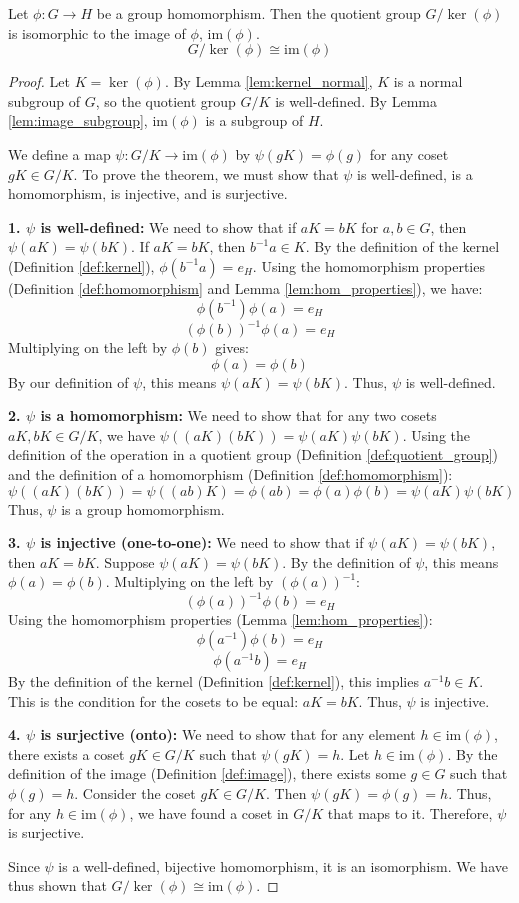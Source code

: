 \begin{theorem}
\label{thm:first_isomorphism}
Let $\phi: G \to H$ be a group homomorphism. Then the quotient group $G/\ker(\phi)$ is isomorphic to the image of $\phi$, $\text{im}(\phi)$.
$$ G/\ker(\phi) \cong \text{im}(\phi) $$
\end{theorem}
\begin{proof}
Let $K = \ker(\phi)$. By Lemma \ref{lem:kernel_normal}, $K$ is a normal subgroup of $G$, so the quotient group $G/K$ is well-defined. By Lemma \ref{lem:image_subgroup}, $\text{im}(\phi)$ is a subgroup of $H$.

We define a map $\psi: G/K \to \text{im}(\phi)$ by $\psi(gK) = \phi(g)$ for any coset $gK \in G/K$. To prove the theorem, we must show that $\psi$ is well-defined, is a homomorphism, is injective, and is surjective.

\textbf{1. $\psi$ is well-defined:}
We need to show that if $aK = bK$ for $a, b \in G$, then $\psi(aK) = \psi(bK)$.
If $aK = bK$, then $b^{-1}a \in K$.
By the definition of the kernel (Definition \ref{def:kernel}), $\phi(b^{-1}a) = e_H$.
Using the homomorphism properties (Definition \ref{def:homomorphism} and Lemma \ref{lem:hom_properties}), we have:
$$ \phi(b^{-1})\phi(a) = e_H $$
$$ (\phi(b))^{-1}\phi(a) = e_H $$
Multiplying on the left by $\phi(b)$ gives:
$$ \phi(a) = \phi(b) $$
By our definition of $\psi$, this means $\psi(aK) = \psi(bK)$. Thus, $\psi$ is well-defined.

\textbf{2. $\psi$ is a homomorphism:}
We need to show that for any two cosets $aK, bK \in G/K$, we have $\psi((aK)(bK)) = \psi(aK)\psi(bK)$.
Using the definition of the operation in a quotient group (Definition \ref{def:quotient_group}) and the definition of a homomorphism (Definition \ref{def:homomorphism}):
$$ \psi((aK)(bK)) = \psi((ab)K) = \phi(ab) = \phi(a)\phi(b) = \psi(aK)\psi(bK) $$
Thus, $\psi$ is a group homomorphism.

\textbf{3. $\psi$ is injective (one-to-one):}
We need to show that if $\psi(aK) = \psi(bK)$, then $aK = bK$.
Suppose $\psi(aK) = \psi(bK)$. By the definition of $\psi$, this means $\phi(a) = \phi(b)$.
Multiplying on the left by $(\phi(a))^{-1}$:
$$ (\phi(a))^{-1}\phi(b) = e_H $$
Using the homomorphism properties (Lemma \ref{lem:hom_properties}):
$$ \phi(a^{-1})\phi(b) = e_H $$
$$ \phi(a^{-1}b) = e_H $$
By the definition of the kernel (Definition \ref{def:kernel}), this implies $a^{-1}b \in K$.
This is the condition for the cosets to be equal: $aK = bK$.
Thus, $\psi$ is injective.

\textbf{4. $\psi$ is surjective (onto):}
We need to show that for any element $h \in \text{im}(\phi)$, there exists a coset $gK \in G/K$ such that $\psi(gK) = h$.
Let $h \in \text{im}(\phi)$. By the definition of the image (Definition \ref{def:image}), there exists some $g \in G$ such that $\phi(g) = h$.
Consider the coset $gK \in G/K$. Then $\psi(gK) = \phi(g) = h$.
Thus, for any $h \in \text{im}(\phi)$, we have found a coset in $G/K$ that maps to it. Therefore, $\psi$ is surjective.

Since $\psi$ is a well-defined, bijective homomorphism, it is an isomorphism. We have thus shown that $G/\ker(\phi) \cong \text{im}(\phi)$.
\end{proof}
